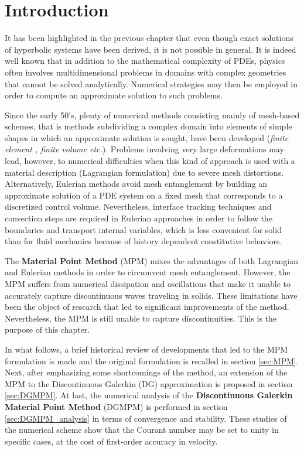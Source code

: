 
\section*{Introduction}
It has been highlighted in the previous chapter that even though exact solutions of hyperbolic systems have been derived, it is not possible in general. It is indeed well known that in addition to the mathematical complexity of PDEs, physics often involves multidimensional problems in domains with complex geometries that cannot be solved analytically. Numerical strategies may then be employed in order to compute an approximate solution to such problems.

Since the early 50's, plenty of numerical methods consisting mainly of mesh-based schemes, that is methods subdividing a complex domain into elements of simple shapes in which an approximate solution is sought, have been developed (\textit{finite element \cite{Belytschko}, finite volume \cite{Leveque} etc.}). Problems involving very large deformations may lead, however, to numerical difficulties when this kind of approach is used with a material description (Lagrangian formulation) due to severe mesh distortions. Alternatively, Eulerian methods avoid mesh entanglement by building an approximate solution of a PDE system on a fixed mesh that corresponds to a discretized control volume. Nevertheless, interface tracking techniques and convection steps are required in Eulerian approaches in order to follow the boundaries and transport internal variables, which is less convenient for solid than for fluid mechanics because of history dependent constitutive behaviors.

The \textbf{Material Point Method} (MPM) \cite{Sulsky94} mixes the advantages of both Lagrangian and Eulerian methods in order to circumvent mesh entanglement.
However, the MPM suffers from numerical dissipation and oscillations that make it unable to accurately capture discontinuous waves traveling in solids.
These limitations have been the object of research that led to significant improvements of the method.
Nevertheless, the MPM is still unable to capture discontinuities.
This is the purpose of this chapter.

In what follows, a brief historical review of developments that led to the MPM formulation is made and the original formulation is recalled in section \ref{sec:MPM}. Next, after emphasizing some shortcomings of the method, an extension of the MPM to the Discontinuous Galerkin (DG) approximation is proposed in section \ref{sec:DGMPM}. At last, the numerical analysis of the \textbf{Discontinuous Galerkin Material Point Method} (DGMPM) is performed in section \ref{sec:DGMPM_analysis} in terms of convergence and stability. These studies of the numerical scheme show that the Courant number may be set to unity in specific cases, at the cost of first-order accuracy in velocity.



